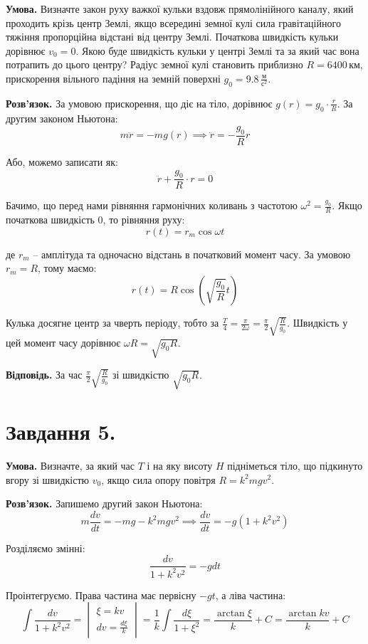 \documentclass[12pt]{extarticle}
\begin{document}
\textbf{Умова.} Визначте закон руху важкої кульки вздовж прямолінійного каналу, який проходить крізь центр Землі, якщо всередині земної кулі сила гравітаційного тяжіння пропорційна відстані від центру Землі. Початкова швидкість кульки дорівнює $v_0 = 0$. Якою буде швидкість кульки у центрі Землі та за який час вона потрапить до цього центру? Радіус земної кулі становить приблизно $R=6400 \,\text{км}$, прискорення вільного падіння на земній поверхні $g_0 = 9.8 \, \frac{\text{м}}{\text{с}^2}$.

\textbf{Розв'язок.} За умовою прискорення, що діє на тіло, дорівнює $g(r) = g_0 \cdot \frac{r}{R}$. За другим законом Ньютона:
\[
m\ddot{r} = -mg(r) \implies \ddot{r} = -\frac{g_0}{R}r
\]

Або, можемо записати як:
\[
\ddot{r} + \frac{g_0}{R}\cdot r = 0
\]

Бачимо, що перед нами рівняння гармонічних коливань з частотою $\omega^2 = \frac{g_0}{R}$. Якщо початкова швидкість $0$, то рівняння руху:
\[
r(t) = r_m \cos \omega t
\]

де $r_m$ -- амплітуда та одночасно відстань в початковий момент часу. За умовою $r_m=R$, тому маємо:
\[
r(t) = R \cos \left(\sqrt{\frac{g_0}{R}}t\right)
\]

Кулька досягне центр за чверть періоду, тобто за $\frac{T}{4} = \frac{\pi}{2\omega} = \frac{\pi}{2}\sqrt{\frac{R}{g_0}}$. Швидкість у цей момент часу дорівнює $\omega R = \sqrt{g_0R}$. 

\textbf{Відповідь.} За час $\frac{\pi}{2}\sqrt{\frac{R}{g_0}}$ зі швидкістю $\sqrt{g_0R}$. 

\section*{Завдання 5.}

\textbf{Умова.} Визначте, за який час $T$ і на яку висоту $H$ підніметься тіло, що підкинуто вгору зі швидкістю $v_0$, якщо сила опору повітря $R = k^2 mg v^2$. 

\textbf{Розв'язок.} Запишемо другий закон Ньютона:
\[
m \frac{dv}{dt} = -mg - k^2 mg v^2 \implies \frac{dv}{dt} = -g(1 + k^2v^2)
\]

Розділяємо змінні:
\[
\frac{dv}{1+k^2v^2} = -gdt
\]

Проінтегруємо. Права частина має первісну $-gt$, а ліва частина:
\[
\int \frac{dv}{1+k^2v^2} = \begin{vmatrix}
    \xi = kv \\ dv = \frac{d\xi}{k}
\end{vmatrix} = \frac{1}{k}\int \frac{d\xi}{1+\xi^2} = \frac{\arctan \xi}{k}+C = \frac{\arctan kv}{k}+C
\]
\end{document}
